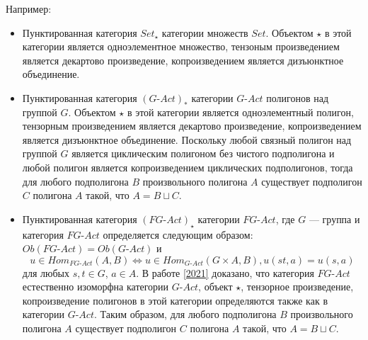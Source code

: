 \documentclass[a4paper,12pt]{article}
\newcommand{\GAct}{G\text{-}Act}
\newcommand{\FGAct}{FG\text{-}Act}
\begin{document}
Например:
\begin{itemize}
    \item Пунктированная категория $Set_\star$ категории множеств $Set$. Объектом $\star$ в этой категории является одноэлементное множество, тензоным произведением является декартово произведение, копроизведением является дизъюнктное объединение.
    \item Пунктированная категория $(\GAct)_*$ категории $\GAct$ полигонов над группой $G$. Объектом $\star$ в этой категории является одноэлементный полигон, тензорным произведением является декартово произведение, копроизведением является дизъюнктное объединение. Поскольку любой связный полигон над группой $G$ является циклическим полигоном без чистого подполигона и любой полигон является копроизведением циклических подполигонов, тогда для любого подполигона $B$ произвольного полигона $A$ существует подполигон $C$ полигона $A$ такой, что $A = B \sqcup C$.
    \item Пунктированная категория $(\FGAct)_\star$ категории $\FGAct$, где $G$ --- группа и категория $\FGAct$ определяется следующим образом: $Ob(\FGAct) = Ob(\GAct)$ и
    $$
    u \in Hom_{\FGAct}(A,B) \Leftrightarrow u \in Hom_{\GAct}(G \times A, B), u(st,a) = u(s,a)
    $$
    для любых $s,t \in G$, $a \in A$. В работе \ref{2021} доказано, что категория $\FGAct$ естественно изоморфна категории $\GAct$, объект $\star$, тензорное произведение, копроизведение полигонов в этой категории определяются также как в категории $\GAct$. Таким образом, для любого подполигона $B$ произвольного полигона $A$ существует подполигон $C$ полигона $A$ такой, что $A = B \sqcup C$.


\end{itemize}
\end{document}
